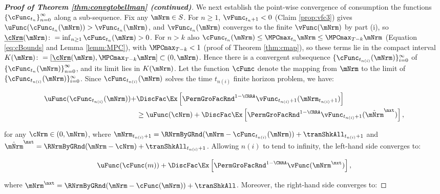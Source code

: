 \documentclass[\econtexRoot/BufferStockTheory]{subfiles}
\begin{document}
\begin{proof}[\textbf{Proof of Theorem \ref{thm:convgtobellman} (continued)}]
%
We next establish the point-wise convergence of consumption the functions $\left\{ \cFunc_{t_{n}}\right\}_{n=0}^{\infty}$ along a sub-sequence.
Fix any $\mNrm\in S$.
For $n\geq 1$, $\vFunc_{t_{n}+1}<0$ (Claim \ref{prop:vfc3}) gives $\uFunc(\cFunc_{t_{n}}(\mNrm))>\vFunc_{t_{n}}(\mNrm)$, and $\vFunc_{t_{n}}(\mNrm)$ converges to the finite $\vFunc(\mNrm)$ by part (i), so $\underline{\cNrm}(\mNrm)\colon=\inf_{n\geq 1}\cFunc_{t_{n}}(\mNrm)>0$.
For $n>k$ also $\cFunc_{t_{n}}(\mNrm)\leq\MPCmax_{t_{n}}\mNrm\leq\MPCmax_{T-k}\mNrm$ (Equation \eqref{eq:cBounds} and Lemma \ref{lemm:MPC}), with $\MPCmax_{T-k}<1$ (proof of Theorem \ref{thm:cmap}), so these terms lie in the compact interval $K(\mNrm)\colon=[\underline{\cNrm}(\mNrm),\MPCmax_{T-k}\mNrm]\subset(0,\mNrm)$.
Hence there is a convergent subsequence $\{\cFunc_{t_{n(i)}}(\mNrm)\}_{i=0}^{\infty}$ of $\left\{ \cFunc_{t_{n}}(\mNrm) \right\}_{n=0}^{\infty}$, and its limit lies in $K(\mNrm)$.
Let the function $\cFunc$ denote the mapping from $\mNrm$ to the limit of $\{\cFunc_{t_{n(i)}}(\mNrm)\}_{i=0}^{\infty}$.
Since $\cFunc_{t_{n(i)}}(\mNrm)$ solves the time $t_{n(i)}$ finite horizon problem, we have:

\begin{samepage}
\begin{equation}
\begin{aligned}
\uFunc(\cFunc_{t_{n(i)}}(\mNrm)) + & \DiscFac \Ex \left[ {\PermGroFacRnd}^{1 - \CRRA} \vFunc_{t_{n(i)}+1}(\mNrm_{t_{n(i)}+1}) \right] \\
& \geq \uFunc(\cNrm) + \DiscFac \Ex \left[ {\PermGroFacRnd}^{1 - \CRRA} \vFunc_{t_{n(i)}+1}(\hat{\mNrm}^{\nxt}) \right], 
\end{aligned}
\end{equation}
\end{samepage}
for any $\cNrm \in (0, \mNrm)$, where $\mNrm_{t_{n(i)}+1} = \RNrmByGRnd(\mNrm - \cFunc_{t_{n(i)}}(\mNrm)) + \tranShkAll_{t_{n(i)}+1}$ and $\hat{\mNrm}^{\nxt} = \RNrmByGRnd(\mNrm - \cNrm) + \tranShkAll_{t_{n(i)}+1}$.
%
Allowing $n(i)$ to tend to infinity, the left-hand side converges to:
 
\begin{equation}
\uFunc(\cFunc(m)) + \DiscFac \Ex \left[ {\PermGroFacRnd}^{1 - \CRRA} \vFunc(\mNrm^{\nxt}) \right],
\end{equation}

where $\mNrm^{\nxt} = \RNrmByGRnd(\mNrm - \cFunc(\mNrm)) + \tranShkAll$.
Moreover, the right-hand side converges to:


\end{proof}
\end{document}
